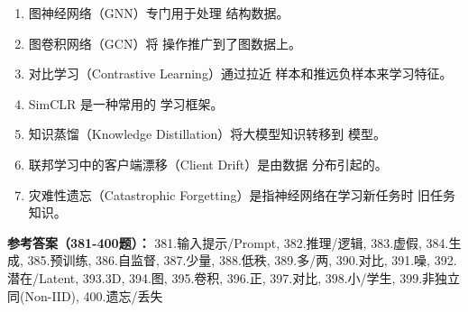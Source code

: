 \begin{enumerate}[resume,leftmargin=2em,itemsep=1pt]
\item 图神经网络（GNN）专门用于处理 \underline{\hspace{3em}} 结构数据。
\item 图卷积网络（GCN）将 \underline{\hspace{3em}} 操作推广到了图数据上。
\item 对比学习（Contrastive Learning）通过拉近 \underline{\hspace{3em}} 样本和推远负样本来学习特征。
\item SimCLR 是一种常用的 \underline{\hspace{3em}} 学习框架。
\item 知识蒸馏（Knowledge Distillation）将大模型知识转移到 \underline{\hspace{3em}} 模型。
\item 联邦学习中的客户端漂移（Client Drift）是由数据 \underline{\hspace{3em}} 分布引起的。
\item 灾难性遗忘（Catastrophic Forgetting）是指神经网络在学习新任务时 \underline{\hspace{3em}} 旧任务知识。
\end{enumerate}

\textbf{参考答案（381-400题）：}
381.输入提示/Prompt, 382.推理/逻辑, 383.虚假, 384.生成, 385.预训练, 386.自监督, 387.少量, 388.低秩, 389.多/两, 390.对比, 391.噪, 392.潜在/Latent, 393.3D, 394.图, 395.卷积, 396.正, 397.对比, 398.小/学生, 399.非独立同(Non-IID), 400.遗忘/丢失

